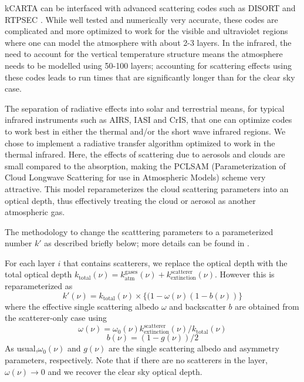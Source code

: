 \documentclass[11pt]{article}
\newcommand{\kc}{\textsf{kCARTA}\xspace}
\newcommand{\disort}{\textsf{DISORT}\xspace}
\begin{document}
\kc can be interfaced with advanced scattering codes such as \disort
\cite{stam:88} and RTPSEC \cite{dee:98}. While well tested and
numerically very accurate, these codes are complicated and more
optimized to work for the visible and ultraviolet regions where one
can model the atmosphere with about 2-3 layers. In the infrared, the 
need to account for the vertical temperature structure means the atmosphere
needs to be modelled using 50-100 layers; accounting for 
scattering effects using these codes leads to run times that are 
significantly longer than for the clear sky case.


The separation of radiative effects into solar and  terrestrial means, 
for typical infrared instruments such as AIRS, IASI and CrIS, that one can 
optimize codes to work best in either the thermal and/or the short wave infrared regions.
We chose to implement a radiative transfer algorithm optimized to work 
in the thermal infrared. Here, the effects of scattering due to aerosols and clouds
are small compared to the absorption, making the
\textsf{PCLSAM} (Parameterization of Cloud Longwave Scattering for use
in Atmospheric Models) scheme \cite{cho:99} very attractive. This
model reparameterizes the cloud scattering parameters into an optical depth, 
thus effectively treating the cloud or aerosol as another atmospheric gas. 

The methodology to change the scatttering parameters to a
parameterized number $k\prime$ as described briefly below; more
details can be found in \cite{cho:99,mat:05}.

For each layer $i$ that contains scatterers, we replace the optical
depth with the total optical depth $k_{\text{total}}(\nu) =
k_{\text{atm}}^{\text{gases}}(\nu) +
k^{\text{scatterer}}_{\text{extinction}}(\nu)$.  However this is
reparameterized as
\[
k\prime(\nu) = k_{\text{total}}(\nu) \times \{ (1-\omega(\nu)
(1-b(\nu)) \}
\]
where the effective single scattering albedo $\omega$ and backscatter
$b$ are obtained from the scatterer-only case using
\[
\omega(\nu) = \omega_{0}(\nu)
k^{\text{scatterer}}_{\text{extinction}}(\nu)/k_{\text{total}}(\nu)
\]
\[
b(\nu) = (1 - g(\nu))/2
\]
As usual,$\omega_{0}(\nu)$ and $g(\nu)$ are the single scattering albedo and
asymmetry parameters, respectively. 
Note that if there are no scatterers in the layer, $\omega(\nu)
\rightarrow 0$ and we recover the clear sky optical depth.
\end{document}
